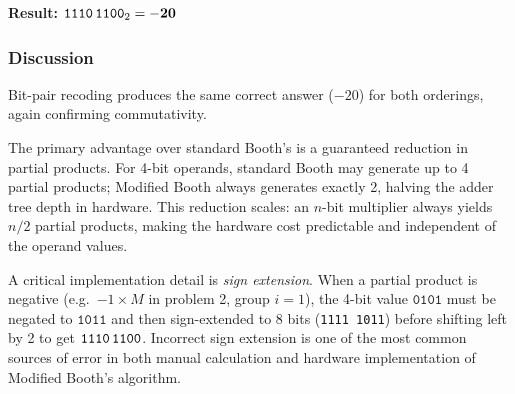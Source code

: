 \documentclass{article}
\begin{document}
\noindent
\textbf{Result:} $\texttt{1110\,1100}_2 = \mathbf{-20}$ \checkmark

\subsubsection*{Discussion}

Bit-pair recoding produces the same correct answer ($-20$) for both orderings,
again confirming commutativity.

The primary advantage over standard Booth's is a guaranteed reduction in partial
products.  For 4-bit operands, standard Booth may generate up to 4 partial products;
Modified Booth always generates exactly 2, halving the adder tree depth in hardware.
This reduction scales: an $n$-bit multiplier always yields $n/2$ partial products,
making the hardware cost predictable and independent of the operand values.

A critical implementation detail is \emph{sign extension}.  When a partial product
is negative (e.g.\ $-1 \times M$ in problem 2, group $i=1$), the 4-bit value
$\texttt{0101}$ must be negated to $\texttt{1011}$ and then sign-extended to 8 bits
(\texttt{1111\,1011}) before shifting left by 2 to get $\texttt{1110\,1100}$.
Incorrect sign extension is one of the most common sources of error in both
manual calculation and hardware implementation of Modified Booth's algorithm.
\end{document}
